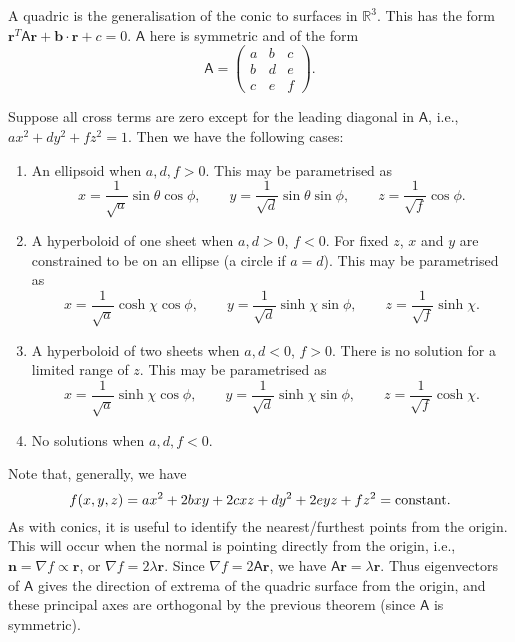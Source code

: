 \documentclass[letter-paper]{tufte-book}
\newenvironment{example}[1][Example]{\begin{trivlist}
\item[\hskip \labelsep {\bfseries #1}]}{\end{trivlist}}
\newcommand{\bb}{\boldsymbol{b}}
\newcommand{\nb}{\boldsymbol{n}}
\begin{document}
A quadric is the generalisation of the conic to surfaces in $\mathbb{R}^3$. This
has the form $\boldsymbol{r}^T\mathsf{A}\boldsymbol{r}+\bb\cdot\boldsymbol{r} +
c=0$. $\mathsf{A}$ here is symmetric and of the form
\begin{equation*}
	\mathsf{A}=\begin{pmatrix}a&b&c\\b&d&e\\c&e&f\end{pmatrix}.
\end{equation*}
\begin{example}
	Suppose all cross terms are zero except for the leading diagonal in
	$\mathsf{A}$, i.e., $ax^2+dy^2+fz^2=1$. Then we have the following cases:
	\begin{enumerate}
		\item An ellipsoid when $a,d,f>0$. This may be parametrised as
		\begin{equation*}
			x=\frac{1}{\sqrt{a}}\sin\theta\cos\phi,\qquad
			y=\frac{1}{\sqrt{d}}\sin\theta\sin\phi,\qquad
			z=\frac{1}{\sqrt{f}}\cos\phi.
		\end{equation*}
		\item A hyperboloid of one sheet when $a,d>0$, $f<0$. For fixed $z$, $x$
		and $y$ are constrained to be on an ellipse (a circle if $a=d$). This
		may be parametrised as
		\begin{equation*}
			x=\frac{1}{\sqrt{a}}\cosh\chi\cos\phi,\qquad
			y=\frac{1}{\sqrt{d}}\sinh\chi\sin\phi,\qquad
			z=\frac{1}{\sqrt{f}}\sinh\chi.
		\end{equation*}
		\item A hyperboloid of two sheets when $a,d<0$, $f>0$. There is no
		solution for a limited range of $z$. This may be parametrised as
		\begin{equation*}
			x=\frac{1}{\sqrt{a}}\sinh\chi\cos\phi,\qquad
			y=\frac{1}{\sqrt{d}}\sinh\chi\sin\phi,\qquad
			z=\frac{1}{\sqrt{f}}\cosh\chi.
		\end{equation*}
		\item No solutions when $a,d,f<0$.
	\end{enumerate}
\end{example}

Note that, generally, we have
\begin{equation*}
	f(x,y,z)=ax^2+2bxy+2cxz+dy^2+2eyz+fz^2 = \textnormal{constant}.
\end{equation*}
As with conics, it is useful to identify the nearest/furthest points from the
origin. This will occur when the normal is pointing directly from the origin,
i.e., $\nb=\nabla f\propto\boldsymbol{r}$, or $\nabla f=2\lambda\boldsymbol{r}$.
Since $\nabla f=2\mathsf{A}\boldsymbol{r}$, we have $\mathsf{A}\boldsymbol{r} =
\lambda\boldsymbol{r}$. Thus eigenvectors of $\mathsf{A}$ gives the direction of
extrema of the quadric surface from the origin, and these principal axes are
orthogonal by the previous theorem (since $\mathsf{A}$ is symmetric).
\end{document}
